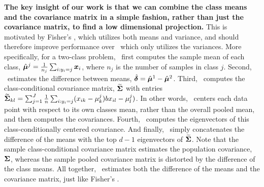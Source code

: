 \documentclass[10pt]{article}
\begin{document}

\textbf{The key insight of our work is that we can combine the class means and the covariance matrix in a simple fashion, rather than just the covariance matrix, to find a low dimensional projection.}
This is motivated  by Fisher's \Lda, which utilizes both means and variance, and should therefore improve performance over \Pca~which only utilizes the variances. 
More specifically, for a two-class problem, \Lol~first computes the sample mean of each class,  $\hat{\boldsymbol{\mu}}^j = \frac{1}{n_j} \sum_{i : y_i = j} \boldsymbol{x}_i$, where $n_j$ is the number of samples in class $j$.  Second, \Lol~estimates the difference between  means,  $\hat{\boldsymbol{\delta}}=\hat{\boldsymbol{\mu}}^1 - \hat{\boldsymbol{\mu}}^2$.  
Third, \Lol~computes the class-conditional covariance matrix, 
$\widetilde{\boldsymbol{\Sigma}}$ with entries $\widetilde{\boldsymbol{\Sigma}}_{kl}= \sum_{j=1}^J \frac{1}{n} \sum_{i : y_i = j} (x_{ik} - \mu^j_{k}) bx_{il} - \mu^j_{l})$.  In other words, \Lol~centers each data point with respect to its own classes mean, rather than the overall pooled mean, and then computes the covariances.    
Fourth, \Lol~computes the eigenvectors of this class-conditionally centered covariance. 
And finally, \Lol~simply concatenates the difference of the means with the top $d-1$ eigenvectors of $\widetilde{\boldsymbol{\Sigma}}$. 
Note that the sample class-conditional covariance matrix estimates the population covariance, $\boldsymbol{\Sigma}$, whereas the sample pooled covariance matrix is distorted by the difference of the class means.  
All together, \Lol~estimates both the difference of the means and the covariance matrix, just like Fisher's \Lda.  

%   
\end{document}
